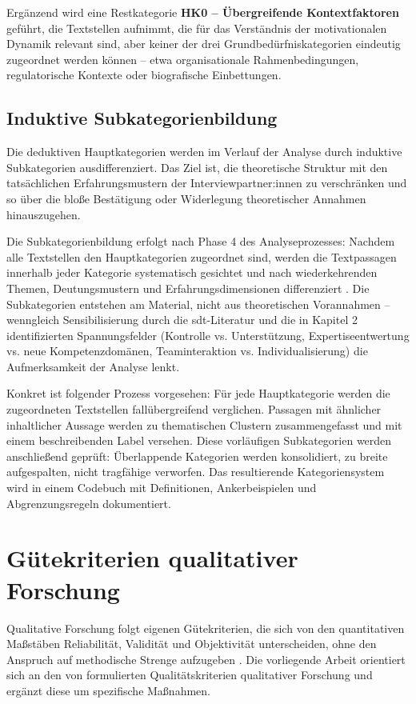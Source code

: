Ergänzend wird eine Restkategorie \textbf{HK0 -- Übergreifende Kontextfaktoren} geführt, die Textstellen aufnimmt, die für das Verständnis der motivationalen Dynamik relevant sind, aber keiner der drei Grundbedürfniskategorien eindeutig zugeordnet werden können -- etwa organisationale Rahmenbedingungen, regulatorische Kontexte oder biografische Einbettungen.


\subsection{Induktive Subkategorienbildung}

Die deduktiven Hauptkategorien werden im Verlauf der Analyse durch induktive Subkategorien ausdifferenziert. Das Ziel ist, die theoretische Struktur mit den tatsächlichen Erfahrungsmustern der Interviewpartner:innen zu verschränken und so über die bloße Bestätigung oder Widerlegung theoretischer Annahmen hinauszugehen.

Die Subkategorienbildung erfolgt nach Phase 4 des Analyseprozesses: Nachdem alle Textstellen den Hauptkategorien zugeordnet sind, werden die Textpassagen innerhalb jeder Kategorie systematisch gesichtet und nach wiederkehrenden Themen, Deutungsmustern und Erfahrungsdimensionen differenziert \parencite{kuckartzQualitativeInhaltsanalyseMethoden2018}. Die Subkategorien entstehen am Material, nicht aus theoretischen Vorannahmen -- wenngleich Sensibilisierung durch die \gls{sdt}-Literatur und die in Kapitel 2 identifizierten Spannungsfelder (Kontrolle vs. Unterstützung, Expertiseentwertung vs. neue Kompetenzdomänen, Teaminteraktion vs. Individualisierung) die Aufmerksamkeit der Analyse lenkt.

Konkret ist folgender Prozess vorgesehen: Für jede Hauptkategorie werden die zugeordneten Textstellen fallübergreifend verglichen. Passagen mit ähnlicher inhaltlicher Aussage werden zu thematischen Clustern zusammengefasst und mit einem beschreibenden Label versehen. Diese vorläufigen Subkategorien werden anschließend geprüft: Überlappende Kategorien werden konsolidiert, zu breite aufgespalten, nicht tragfähige verworfen. Das resultierende Kategoriensystem wird in einem Codebuch mit Definitionen, Ankerbeispielen und Abgrenzungsregeln dokumentiert.

\section{Gütekriterien qualitativer Forschung}
\label{met:guetekriterien}
Qualitative Forschung folgt eigenen Gütekriterien, die sich von den quantitativen Maßstäben Reliabilität, Validität und Objektivität unterscheiden, ohne den Anspruch auf methodische Strenge aufzugeben \parencite{flick2017, mayring2016}. Die vorliegende Arbeit orientiert sich an den von \textcite{mayring2016} formulierten Qualitätskriterien qualitativer Forschung und ergänzt diese um spezifische Maßnahmen.

